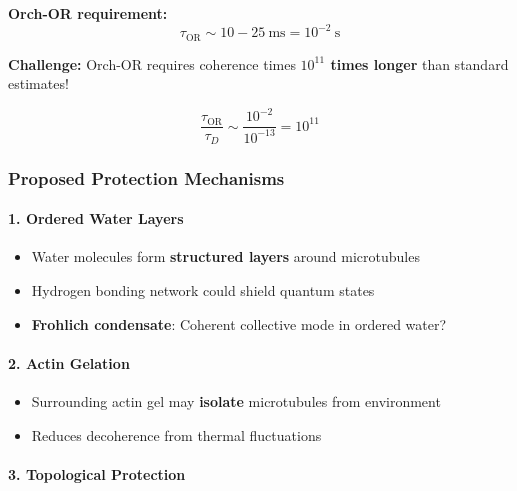\textbf{Orch-OR requirement:}
\begin{equation}
\label{eq:orch-or-time}
\tau_{\text{OR}} \sim 10-25~\text{ms} = 10^{-2}~\text{s}
\end{equation}

\textbf{Challenge:} Orch-OR requires coherence times \textbf{$10^{11}$ times longer} than standard estimates!

\begin{equation}
\label{eq:coherence-gap}
\frac{\tau_{\text{OR}}}{\tau_D} \sim \frac{10^{-2}}{10^{-13}} = 10^{11}
\end{equation}

\subsubsection{Proposed Protection
Mechanisms}\label{proposed-protection-mechanisms}

\paragraph{1. Ordered Water Layers}\label{ordered-water-layers}

\begin{itemize}
\tightlist
\item
  Water molecules form \textbf{structured layers} around microtubules
\item
  Hydrogen bonding network could shield quantum states
\item
  \textbf{Frohlich condensate}: Coherent collective mode in ordered
  water?
\end{itemize}

\paragraph{2. Actin Gelation}\label{actin-gelation}

\begin{itemize}
\tightlist
\item
  Surrounding actin gel may \textbf{isolate} microtubules from
  environment
\item
  Reduces decoherence from thermal fluctuations
\end{itemize}

\paragraph{3. Topological Protection}\label{topological-protection}

